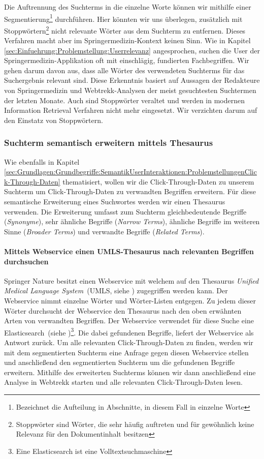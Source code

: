 Die Auftrennung des Suchterms in die einzelne Worte können wir mithilfe einer Segmentierung\footnote{Bezeichnet die Aufteilung in Abschnitte, in diesem Fall in einzelne Worte} durchführen. Hier könnten wir uns überlegen, zusätzlich mit Stoppwörtern\footnote{Stoppwörter sind Wörter, die sehr häufig auftreten und für gewöhnlich keine Relevanz für den Dokumentinhalt besitzen} nicht relevante Wörter aus dem Suchterm zu entfernen. Dieses Verfahren macht aber im Springermedizin-Kontext keinen Sinn. Wie in Kapitel \ref{sec:Einfuehrung:Problemstellung:Userrelevanz} angesprochen, suchen die User der Springermedizin-Applikation oft mit einschlägig, fundierten Fachbegriffen. Wir gehen darum davon aus, dass alle Wörter des verwendeten Suchterms für das Suchergebnis relevant sind. Diese Erkenntnis basiert auf Aussagen der Redakteure von Springermedizin und Webtrekk-Analysen der meist gesuchtesten Suchtermen der letzten Monate. Auch sind Stoppwörter veraltet und werden in modernen Information Retrieval Verfahren nicht mehr eingesetzt. Wir verzichten darum auf den Einstatz von Stoppwörtern.

\subsubsection{Suchterm semantisch erweitern mittels Thesaurus}
\label{sec:Reranking:Methodik:SuchtermSegmentierung:SuchtermThesaurus}

Wie ebenfalls in Kapitel \ref{sec:Grundlagen:Grundbegriffe:SemantikUserInteraktionen:ProblemstellungenClick-Through-Daten} thematisiert, wollen wir die Click-Through-Daten zu unserem Suchterm um Click-Through-Daten zu verwandten Begriffen erweitern. Für diese semantische Erweiterung eines Suchwortes werden wir einen Thesaurus verwenden. Die Erweiterung umfasst zum Suchterm gleichbedeutende Begriffe (\textit{Synonyme}), sehr ähnliche Begriffe (\textit{Narrow Terms}), ähnliche Begriffe im weiteren Sinne (\textit{Broader Terms}) und verwandte Begriffe (\textit{Related Terms}). 

\paragraph{Mittels Webservice einen UMLS-Thesaurus nach relevanten Begriffen durchsuchen}
Springer Nature besitzt einen Webservice mit welchem auf den Thesaurus \textit{Unified Medical Language System}~(UMLS, siehe \cite{UMLS}) zugegriffen werden kann. Der Webservice nimmt einzelne Wörter und Wörter-Listen entgegen. Zu jedem dieser Wörter durchsucht der Webservice den Thesaurus nach den oben erwähnten Arten von verwandten Begriffen. Der Webservice verwendet für diese Suche eine Elasticsearch~(siehe \cite{elasticsearch})\footnote{Eine Elasticsearch ist eine Volltextsuchmaschine}. Die dabei gefundenen Begriffe, liefert der Webservice als Antwort zurück. Um alle relevanten Click-Through-Daten zu finden, werden wir mit dem segmentierten Suchterm eine Anfrage gegen diesen Webservice stellen und anschließend den segmentierten Suchterm um die gefundenen Begriffe erweitern. Mithilfe des erweiterten Suchterms können wir dann anschließend eine Analyse in Webtrekk starten und alle relevanten Click-Through-Daten lesen. 


